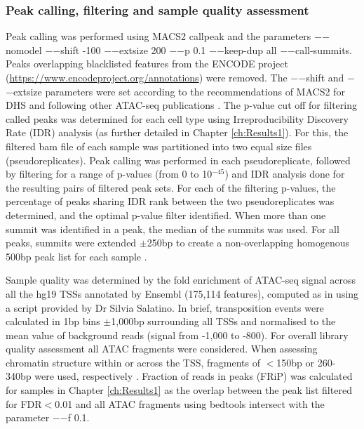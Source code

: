 \subsubsection{Peak calling, filtering and sample quality assessment}
Peak calling was performed using MACS2  callpeak \parencite{Zhang2008} and the parameters $-$$-$nomodel $-$$-$shift -100 $-$$-$extsize 200 $-$$-$p 0.1 $-$$-$keep-dup all $-$$-$call-summits. Peaks overlapping blacklisted features from the ENCODE project (\url{https://www.encodeproject.org/annotations}) were removed. The $-$$-$shift and $-$$-$extsize parameters were set according to the recommendations of MACS2 for DHS and following other ATAC-seq publications \parencite{Buenrostro2015, Corces2016}. The p-value cut off for filtering called peaks was determined for each cell type using Irreproducibility Discovery Rate (IDR) analysis (as further detailed in Chapter \ref{ch:Results1}). For this, the filtered bam file of each sample was partitioned into two equal size files (pseudoreplicates). Peak calling was performed in each pseudoreplicate, followed by filtering for a range of p-values (from 0 to 10$^{-45}$) and IDR analysis done for the resulting pairs of filtered peak sets. For each of the filtering p-values, the percentage of peaks sharing IDR rank between the two pseudoreplicates was determined, and the optimal p-value filter identified. When more than one summit was identified in a peak, the median of the summits was used. For all peaks, summits were extended $\pm$250bp to create a non-overlapping homogenous 500bp peak list for each sample \parencite{Buenrostro2015, Corces2016}. 

Sample quality was determined by the fold enrichment of ATAC-seq signal across all the hg19 TSSs annotated by Ensembl (175,114 features), computed as in \parencite{Buenrostro2015} using a script provided by Dr Silvia Salatino. In brief, transposition events were calculated in 1bp bins $\pm$1,000bp surrounding all TSSs and normalised to the mean value of background reads (signal from -1,000 to -800). For overall library quality assessment all ATAC fragments were considered. When assessing chromatin structure within or across the TSS, fragments of $<$150bp or 260-340bp were used, respectively \parencite{Scharer2016}. Fraction of reads in peaks (FRiP) was calculated for samples in Chapter \ref{ch:Results1} as the overlap between the peak list filtered for FDR$<$0.01 and all ATAC fragments using bedtools intersect with the parameter $-$$-$f 0.1.

